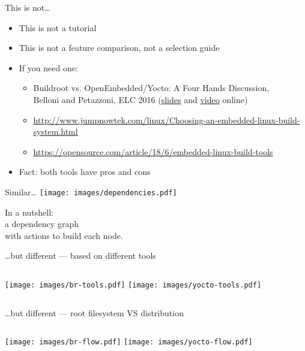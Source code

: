 \documentclass[xetex,table,aspectratio=43]{beamer}
\newcommand{\bg}[1]{
  \usebackgroundtemplate{
    \texttt{[image: images/bg-\#1.png]}
  }
}
\begin{document}
\begin{frame}{This is not\dots}
  \begin{itemize}
  \item This is not a tutorial
  \pause
  \item This is not a feature comparison, not a selection guide
  \pause
  \item If you need one:
    \begin{itemize}
    \item Buildroot vs. OpenEmbedded/Yocto: A Four Hands
      Discussion,\\ Belloni and Petazzoni, ELC 2016
      (\href{https://elinux.org/images/7/7a/Bellonipetazzoni.pdf}{slides}
      and \href{https://www.youtube.com/watch?v=13LZ0szWSVg}{video}
      online)
    \item
      \url{http://www.jumpnowtek.com/linux/Choosing-an-embedded-linux-build-system.html}
    \item
      \url{https://opensource.com/article/18/6/embedded-linux-build-tools}
    \end{itemize}
  \pause
  \item Fact: both tools have pros and cons
  \end{itemize}
\end{frame}

\bg{both}
\begin{frame}{Similar\dots}
  \center\texttt{[image: images/dependencies.pdf]}

  In a nutshell:\\
  a dependency graph\\
  with actions to build each node.
\end{frame}

\begin{frame}{\dots but different --- based on different tools}
  \begin{columns}
    \center\texttt{[image: images/br-tools.pdf]}
    \center\texttt{[image: images/yocto-tools.pdf]}
  \end{columns}
\end{frame}

\begin{frame}{\dots but different --- root filesystem VS distribution}
  \begin{columns}
    \center\texttt{[image: images/br-flow.pdf]}
    \center\texttt{[image: images/yocto-flow.pdf]}
  \end{columns}
\end{frame}
\end{document}
